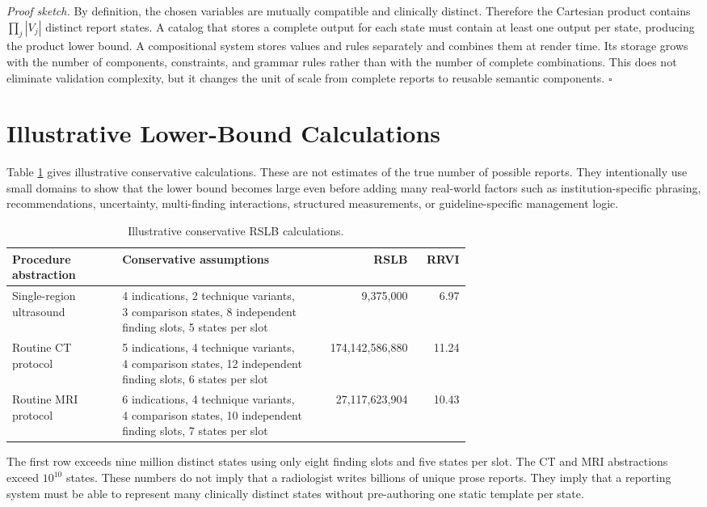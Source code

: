 \documentclass[11pt]{article}
\begin{document}
\textit{Proof sketch.} By definition, the chosen variables are mutually compatible and clinically distinct. Therefore the Cartesian product contains $\prod_j |V_j|$ distinct report states. A catalog that stores a complete output for each state must contain at least one output per state, producing the product lower bound. A compositional system stores values and rules separately and combines them at render time. Its storage grows with the number of components, constraints, and grammar rules rather than with the number of complete combinations. This does not eliminate validation complexity, but it changes the unit of scale from complete reports to reusable semantic components. \hfill $\square$

\section{Illustrative Lower-Bound Calculations}

Table \ref{tab:rslb} gives illustrative conservative calculations. These are not estimates of the true number of possible reports. They intentionally use small domains to show that the lower bound becomes large even before adding many real-world factors such as institution-specific phrasing, recommendations, uncertainty, multi-finding interactions, structured measurements, or guideline-specific management logic.

\begin{table}[ht]
\centering
\caption{Illustrative conservative RSLB calculations.}
\label{tab:rslb}
\begin{tabular}{p{0.24\linewidth}p{0.42\linewidth}rr}
\toprule
Procedure abstraction & Conservative assumptions & RSLB & RRVI \\
\midrule
Single-region ultrasound & 4 indications, 2 technique variants, 3 comparison states, 8 independent finding slots, 5 states per slot & 9,375,000 & 6.97 \\
Routine CT protocol & 5 indications, 4 technique variants, 4 comparison states, 12 independent finding slots, 6 states per slot & 174,142,586,880 & 11.24 \\
Routine MRI protocol & 6 indications, 4 technique variants, 4 comparison states, 10 independent finding slots, 7 states per slot & 27,117,623,904 & 10.43 \\
\bottomrule
\end{tabular}
\end{table}

The first row exceeds nine million distinct states using only eight finding slots and five states per slot. The CT and MRI abstractions exceed $10^{10}$ states. These numbers do not imply that a radiologist writes billions of unique prose reports. They imply that a reporting system must be able to represent many clinically distinct states without pre-authoring one static template per state.
\end{document}
